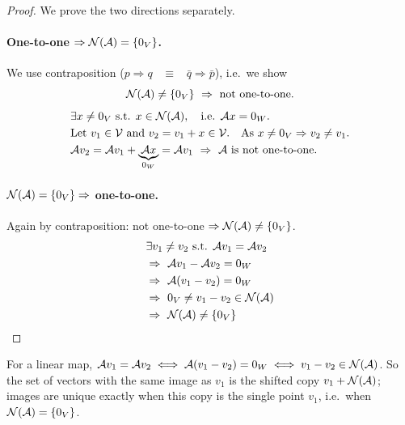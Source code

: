 \begin{proof}
We prove the two directions separately.
\paragraph{One-to-one $\Rightarrow \mathcal{N}(\mathcal{A})=\{0_V\}$.}
We use contraposition ($p\Rightarrow q$ \ $\equiv$ \ $\bar q\Rightarrow \bar p$), i.e.\ we show
\[
\Null(\mathcal{A})\ne\{0_V\} \ \Rightarrow\ \text{not one-to-one.}
\]
\begin{align*}
&\exists x\ne 0_V \text{ s.t. } x\in\mathcal{N}(\mathcal{A}), \quad\text{i.e. } \mathcal{A}x=0_W.\\
&\text{Let } v_1\in\mathcal{V} \text{ and } v_2=v_1+x\in\mathcal{V}. \quad\text{As } x\ne 0_V \Rightarrow v_2\ne v_1.\\
&\mathcal{A}v_2=\mathcal{A}v_1+\underbrace{\mathcal{A}x}_{0_W}=\mathcal{A}v_1
  \ \Rightarrow\ \mathcal{A} \text{ is not one-to-one.}
\end{align*}
\par
\paragraph{$\mathcal{N}(\mathcal{A})=\{0_V\}\Rightarrow$ one-to-one.}
Again by contraposition: not one-to-one $\Rightarrow \mathcal{N}(\mathcal{A})\ne\{0_V\}$.
\begin{align*}
&\exists v_1\ne v_2 \text{ s.t. } \mathcal{A}v_1=\mathcal{A}v_2\\
&\Rightarrow\ \mathcal{A}v_1-\mathcal{A}v_2=0_W\\
&\Rightarrow\ \mathcal{A}(v_1-v_2)=0_W\\
&\Rightarrow\ 0_V\ne v_1-v_2\in\mathcal{N}(\mathcal{A})\\
&\Rightarrow\ \mathcal{N}(\mathcal{A})\ne\{0_V\} \qedhere
\end{align*}
\end{proof}
\begin{insight}
For a linear map, $\mathcal{A}v_1=\mathcal{A}v_2\iff\mathcal{A}(v_1-v_2)=0_W\iff v_1-v_2\in\mathcal{N}(\mathcal{A})$. So the set of vectors with the same image as $v_1$ is the shifted copy $v_1+\mathcal{N}(\mathcal{A})$; images are unique exactly when this copy is the single point $v_1$, i.e.\ when $\mathcal{N}(\mathcal{A})=\{0_V\}$.
\end{insight}

